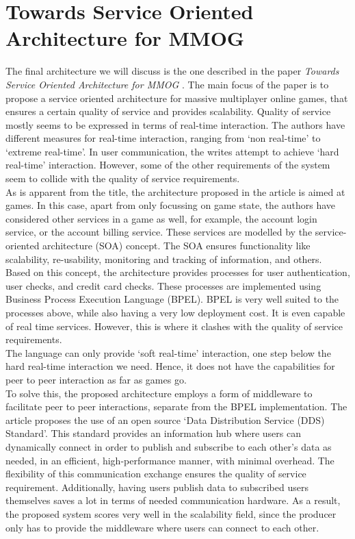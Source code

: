 \section*{Towards Service Oriented Architecture for MMOG}
The final architecture we will discuss is the one described in the paper \emph{Towards Service Oriented Architecture for MMOG} \cite{service}.
The main focus of the paper is to propose a service oriented architecture for massive multiplayer online games, that ensures a certain quality of service and provides scalability.
Quality of service mostly seems to be expressed in terms of real-time interaction.
The authors have different measures for real-time interaction, ranging from `non real-time' to `extreme real-time'.
In user communication, the writes attempt to achieve `hard real-time' interaction.
However, some of the other requirements of the system seem to collide with the quality of service requirements. \\

As is apparent from the title, the architecture proposed in the article is aimed at games.
In this case, apart from only focussing on game state, the authors have considered other services in a game as well, for example, the account login service, or the account billing service.
These services are modelled by the service-oriented architecture (SOA) concept.
The SOA ensures functionality like scalability, re-usability, monitoring and tracking of information, and others. \\
Based on this concept, the architecture provides processes for user authentication, user checks, and credit card checks.
These processes are implemented using Business Process Execution Language (BPEL).
BPEL is very well suited to the processes above, while also having a very low deployment cost.
It is even capable of real time services.
However, this is where it clashes with the quality of service requirements. \\
The language can only provide `soft real-time' interaction, one step below the hard real-time interaction we need.
Hence, it does not have the capabilities for peer to peer interaction as far as games go. \\

To solve this, the proposed architecture employs a form of middleware to facilitate peer to peer interactions, separate from the BPEL implementation.
The article proposes the use of an open source `Data Distribution Service (DDS) Standard'.
This standard provides an information hub where users can dynamically connect in order to publish and subscribe to each other's data as needed, in an efficient, high-performance manner, with minimal overhead.
The flexibility of this communication exchange ensures the quality of service requirement.
Additionally, having users publish data to subscribed users themselves saves a lot in terms of needed communication hardware. 
As a result, the proposed system scores very well in the scalability field, since the producer only has to provide the middleware where users can connect to each other. \\

